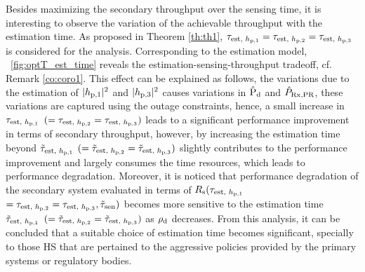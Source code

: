 Besides maximizing the secondary throughput over the sensing time, it is interesting to observe the variation of the achievable throughput with the estimation time.
As proposed in Theorem \ref{th:th1}, $\tau_{\text{est, $h_{\text{p,1}}$}} = \tau_{\text{est, $h_{\text{p,2}}$}} = \tau_{\text{est, $h_{\text{p,3}}$}}$ is considered for the analysis. Corresponding to the estimation model, \figurename~\ref{fig:optT_est_time} reveals the estimation-sensing-throughput tradeoff, cf. Remark \ref{co:coro1}. This effect can be explained as follows, the variations due to the estimation of $|h_{\text{p,1}}|^2$ and $|h_{\text{p,3}}|^2$ causes variations in $\hat{\text{P}}_{\text{d}}$ and $\hat{P}_{\text{Rx,PR}}$, these variations are captured using the outage constraints, hence, a small increase in $\tau_{\text{est, $h_{\text{p,1}}$}}$ $(= \tau_{\text{est, $h_{\text{p,2}}$}} = \tau_{\text{est, $h_{\text{p,3}}$}})$ leads to a significant performance improvement in terms of secondary throughput, however, by increasing the estimation time beyond $\tilde{\tau}_{\text{est, $h_{\text{p,1}}$}}$ $(= \tilde{\tau}_{\text{est, $h_{\text{p,2}}$}}= \tilde{\tau}_{\text{est, $h_{\text{p,3}}$}})$ slightly contributes to the performance improvement and largely consumes the time resources, which leads to performance degradation. Moreover, it is noticed that performance degradation of the secondary system evaluated in terms of $R_{\text{s}}(\tau_{\text{est, $h_{\text{p,1}}$}}$ $= \tau_{\text{est, $h_{\text{p,2}}$}} = \tau_{\text{est, $h_{\text{p,3}}$}}, \tilde{\tau}_{\text{sen}})$ becomes more sensitive to the estimation time $\tilde{\tau}_{\text{est, $h_{\text{p,1}}$}}$ $(= \tilde{\tau}_{\text{est, $h_{\text{p,2}}$}}= \tilde{\tau}_{\text{est, $h_{\text{p,3}}$}})$ as $\rho_{\text{d}}$ decreases. From this analysis, it can be concluded that a suitable choice of estimation time becomes significant, specially to those HS that are pertained to the aggressive policies provided by the primary systems or regulatory bodies. 


